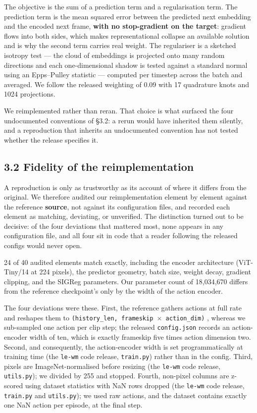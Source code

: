 \documentclass[10pt]{article}
\newcounter{none}
\begin{document}
The objective is the sum of a prediction term and a regularisation term. The
prediction term is the mean squared error between the predicted next embedding
and the encoded next frame, \textbf{with no stop-gradient on the target}: gradient
flows into both sides, which makes representational collapse an available
solution and is why the second term carries real weight. The regulariser is a
sketched isotropy test --- the cloud of embeddings is projected onto many random
directions and each one-dimensional shadow is tested against a standard normal
using an Epps--Pulley statistic --- computed per timestep across the batch and
averaged. We follow the released weighting of 0.09 with 17 quadrature knots and
1024 projections.

We reimplemented rather than reran. That choice is what surfaced the four
undocumented conventions of \S{}3.2: a rerun would have inherited them silently,
and a reproduction that inherits an undocumented convention has not tested
whether the release specifies it.

\subsection{3.2 Fidelity of the reimplementation}\label{fidelity-of-the-reimplementation}

A reproduction is only as trustworthy as its account of where it differs from
the original. We therefore audited our reimplementation element by element
against the reference \textbf{source}, not against its configuration files, and
recorded each element as matching, deviating, or unverified. The distinction
turned out to be decisive: of the four deviations that mattered most, none
appears in any configuration file, and all four sit in code that a reader
following the released configs would never open.

24 of 40 audited elements match exactly, including the encoder
architecture (ViT-Tiny/14 at 224 pixels), the predictor geometry, batch size,
weight decay, gradient clipping, and the SIGReg parameters. Our parameter count
of 18,034,670 differs from the reference checkpoint's only by the width of the
action encoder.

The four deviations were these. First, the reference gathers actions at full
rate and reshapes them to \texttt{(history\_len,\ frameskip\ $\times$\ action\_dim)} \citep[\texttt{stable\_worldmodel/data/buffer.py}]{maes2026swm},
whereas we sub-sampled one action per clip step; the released \texttt{config.json}
records an action-encoder width of ten, which is exactly frameskip five times
action dimension two. Second, and consequently, the action-encoder width is set
programmatically at training time (the \texttt{le-wm} code release, \texttt{train.py}) rather than in the config. Third,
pixels are ImageNet-normalised before resizing (the \texttt{le-wm} code release, \texttt{utils.py}); we divided by 255 and
stopped. Fourth, non-pixel columns are z-scored using dataset statistics with
NaN rows dropped (the \texttt{le-wm} code release, \texttt{train.py} and \texttt{utils.py}); we used raw actions, and the dataset contains exactly
one NaN action per episode, at the final step.
\end{document}
